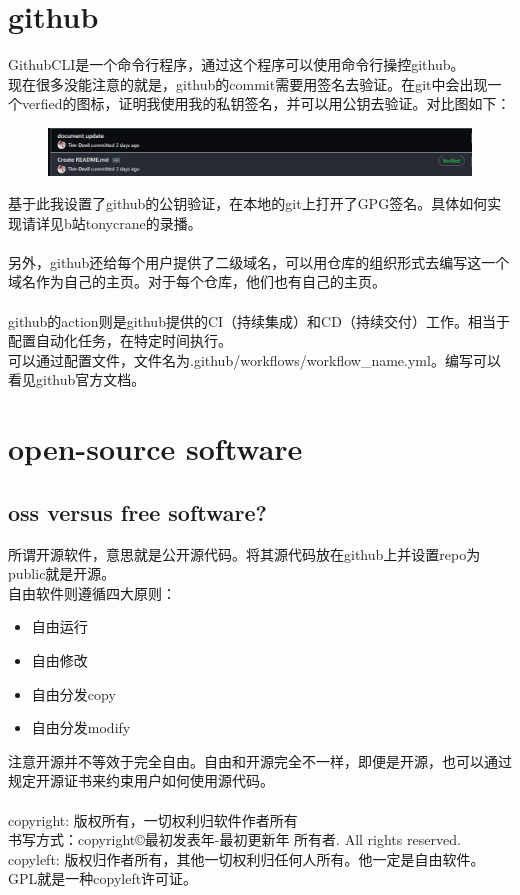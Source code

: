 \documentclass{article}
\begin{document}
\section{github}
\noindent
GithubCLI是一个命令行程序，通过这个程序可以使用命令行操控github。\\
现在很多没能注意的就是，github的commit需要用签名去验证。在git中会出现一个verfied的图标，证明我使用我的私钥签名，并可以用公钥去验证。对比图如下：\\
\begin{figure}[h]
    \centering
    \includegraphics[width=\textwidth]{pic1_verfied.png}\\
\end{figure}
基于此我设置了github的公钥验证，在本地的git上打开了GPG签名。具体如何实现请详见b站tonycrane的录播。\\
\\
另外，github还给每个用户提供了二级域名，可以用仓库的组织形式去编写这一个域名作为自己的主页。对于每个仓库，他们也有自己的主页。\\
\\
github的action则是github提供的CI（持续集成）和CD（持续交付）工作。相当于配置自动化任务，在特定时间执行。\\
可以通过配置文件，文件名为.github/workflows/workflow\_name.yml。编写可以看见github官方文档。
\section{open-source software}
\subsection{oss versus free software?}
\noindent
所谓开源软件，意思就是公开源代码。将其源代码放在github上并设置repo为public就是开源。\\
自由软件则遵循四大原则：
\begin{itemize}
    \item 自由运行
    \item 自由修改
    \item 自由分发copy
    \item 自由分发modify
\end{itemize}
注意开源并不等效于完全自由。自由和开源完全不一样，即便是开源，也可以通过规定开源证书来约束用户如何使用源代码。\\
\\
copyright: 版权所有，一切权利归软件作者所有\\
书写方式：copyright\copyright 最初发表年-最初更新年 所有者. All rights reserved.\\
copyleft: 版权归作者所有，其他一切权利归任何人所有。他一定是自由软件。GPL就是一种copyleft许可证。
\end{document}
